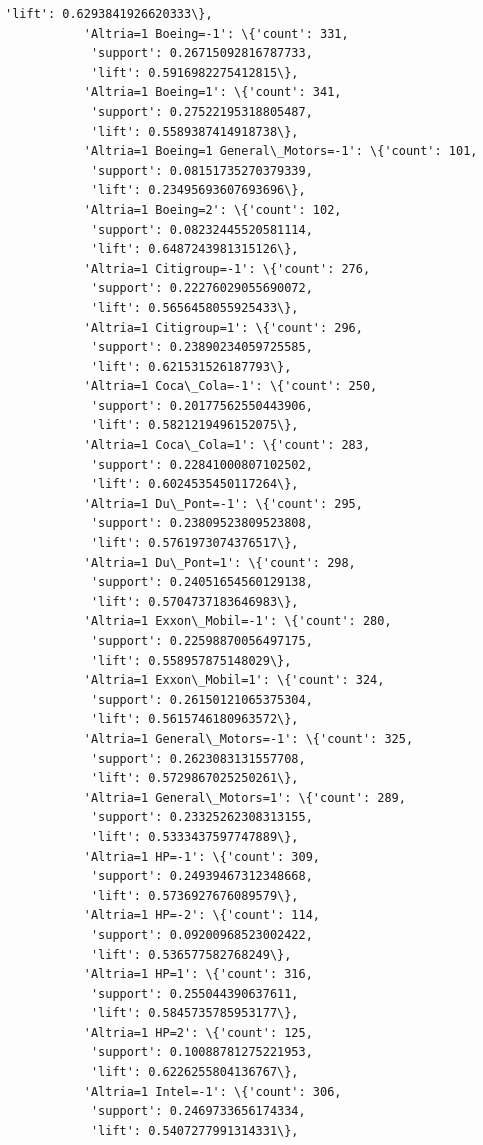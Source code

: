 \documentclass[11pt]{article}
\begin{document}
\begin{Verbatim}[commandchars=\\\{\}]
            'lift': 0.6293841926620333\},
           'Altria=1 Boeing=-1': \{'count': 331,
            'support': 0.26715092816787733,
            'lift': 0.5916982275412815\},
           'Altria=1 Boeing=1': \{'count': 341,
            'support': 0.27522195318805487,
            'lift': 0.5589387414918738\},
           'Altria=1 Boeing=1 General\_Motors=-1': \{'count': 101,
            'support': 0.08151735270379339,
            'lift': 0.23495693607693696\},
           'Altria=1 Boeing=2': \{'count': 102,
            'support': 0.08232445520581114,
            'lift': 0.6487243981315126\},
           'Altria=1 Citigroup=-1': \{'count': 276,
            'support': 0.22276029055690072,
            'lift': 0.5656458055925433\},
           'Altria=1 Citigroup=1': \{'count': 296,
            'support': 0.23890234059725585,
            'lift': 0.621531526187793\},
           'Altria=1 Coca\_Cola=-1': \{'count': 250,
            'support': 0.20177562550443906,
            'lift': 0.5821219496152075\},
           'Altria=1 Coca\_Cola=1': \{'count': 283,
            'support': 0.22841000807102502,
            'lift': 0.6024535450117264\},
           'Altria=1 Du\_Pont=-1': \{'count': 295,
            'support': 0.23809523809523808,
            'lift': 0.5761973074376517\},
           'Altria=1 Du\_Pont=1': \{'count': 298,
            'support': 0.24051654560129138,
            'lift': 0.5704737183646983\},
           'Altria=1 Exxon\_Mobil=-1': \{'count': 280,
            'support': 0.22598870056497175,
            'lift': 0.558957875148029\},
           'Altria=1 Exxon\_Mobil=1': \{'count': 324,
            'support': 0.26150121065375304,
            'lift': 0.5615746180963572\},
           'Altria=1 General\_Motors=-1': \{'count': 325,
            'support': 0.2623083131557708,
            'lift': 0.5729867025250261\},
           'Altria=1 General\_Motors=1': \{'count': 289,
            'support': 0.23325262308313155,
            'lift': 0.5333437597747889\},
           'Altria=1 HP=-1': \{'count': 309,
            'support': 0.24939467312348668,
            'lift': 0.5736927676089579\},
           'Altria=1 HP=-2': \{'count': 114,
            'support': 0.09200968523002422,
            'lift': 0.536577582768249\},
           'Altria=1 HP=1': \{'count': 316,
            'support': 0.255044390637611,
            'lift': 0.5845735785953177\},
           'Altria=1 HP=2': \{'count': 125,
            'support': 0.10088781275221953,
            'lift': 0.6226255804136767\},
           'Altria=1 Intel=-1': \{'count': 306,
            'support': 0.2469733656174334,
            'lift': 0.5407277991314331\},

\end{Verbatim}
\end{document}
